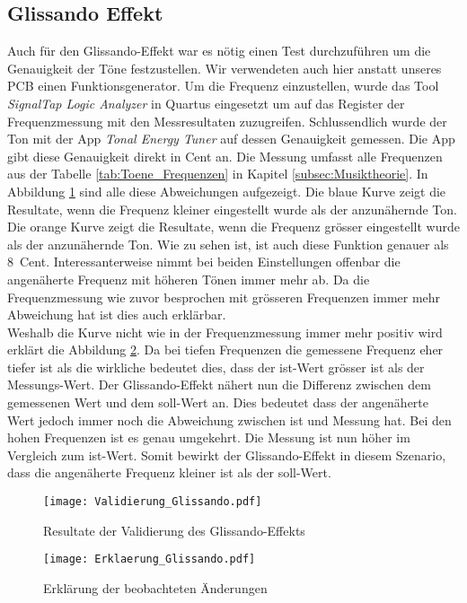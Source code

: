 \subsection{Glissando Effekt}\label{subsec:Glissando_Effekt}
Auch für den Glissando-Effekt war es nötig einen Test durchzuführen um die Genauigkeit der Töne festzustellen. Wir verwendeten auch hier anstatt unseres PCB einen Funktionsgenerator. Um die Frequenz einzustellen, wurde das Tool \textit{SignalTap Logic Analyzer} in Quartus eingesetzt um auf das Register der Frequenzmessung mit den Messresultaten zuzugreifen. Schlussendlich wurde der Ton mit der App \textit{Tonal Energy Tuner} auf dessen Genauigkeit gemessen. Die App gibt diese Genauigkeit direkt in Cent an. Die Messung umfasst alle Frequenzen aus der Tabelle \ref{tab:Toene_Frequenzen} in Kapitel \ref{subsec:Musiktheorie}. In Abbildung \ref{img:Validierung_Glissando} sind alle diese Abweichungen aufgezeigt. Die blaue Kurve  zeigt die Resultate, wenn die Frequenz kleiner eingestellt wurde als der anzunähernde Ton. Die orange Kurve zeigt die Resultate, wenn die Frequenz grösser eingestellt wurde als der anzunähernde Ton. Wie zu sehen ist, ist auch diese Funktion genauer als \SI{8}{Cent}. Interessanterweise nimmt bei beiden Einstellungen offenbar die angenäherte Frequenz mit höheren Tönen immer mehr ab. Da die Frequenzmessung wie zuvor besprochen mit grösseren Frequenzen immer mehr Abweichung hat ist dies auch erklärbar.\\
Weshalb die Kurve nicht wie in der Frequenzmessung immer mehr positiv wird erklärt die Abbildung \ref{img:Erklaerung_Glissando}. Da bei tiefen Frequenzen die gemessene Frequenz eher tiefer ist als die wirkliche bedeutet dies, dass der ist-Wert grösser ist als der Messungs-Wert. Der Glissando-Effekt nähert nun die Differenz zwischen dem gemessenen Wert und dem soll-Wert an. Dies bedeutet dass der angenäherte Wert jedoch immer noch die Abweichung zwischen ist und Messung hat. Bei den hohen Frequenzen ist es genau umgekehrt. Die Messung ist nun höher im Vergleich zum ist-Wert. Somit bewirkt der Glissando-Effekt in diesem Szenario, dass die angenäherte Frequenz kleiner ist als der soll-Wert.


\begin{figure}[h!]
	\centering
	\texttt{[image: Validierung\_Glissando.pdf]}
	\caption{Resultate der Validierung des Glissando-Effekts} 
	\label{img:Validierung_Glissando}
\end{figure}  

\begin{figure}[h!]
	\centering
	\texttt{[image: Erklaerung\_Glissando.pdf]}
	\caption{Erklärung der beobachteten Änderungen} 
	\label{img:Erklaerung_Glissando}
\end{figure} 

